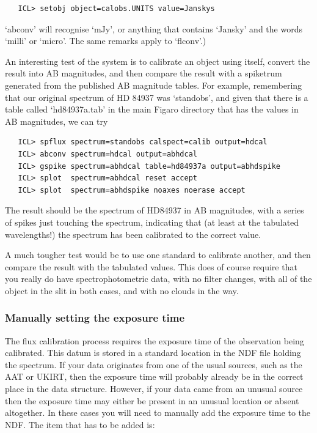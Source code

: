 \begin{verbatim}
   ICL> setobj object=calobs.UNITS value=Janskys
\end{verbatim}

   `abconv' will recognise `mJy', or anything that contains `Jansky'
   and the words `milli' or `micro'.  The same remarks apply to
   `flconv'.)

   An interesting test of the system is to calibrate an object using
   itself, convert the result into AB magnitudes, and then compare the
   result with a spiketrum generated from the published AB magnitude
   tables.  For example, remembering that our original spectrum of
   HD 84937 was `standobs', and given that there is a table called
   `hd84937a.tab' in the main Figaro directory that has the values in AB
   magnitudes, we can try

\begin{verbatim}
   ICL> spflux spectrum=standobs calspect=calib output=hdcal
   ICL> abconv spectrum=hdcal output=abhdcal
   ICL> gspike spectrum=abhdcal table=hd84937a output=abhdspike
   ICL> splot  spectrum=abhdcal reset accept
   ICL> splot  spectrum=abhdspike noaxes noerase accept
\end{verbatim}

   The result should be the spectrum of HD84937 in AB magnitudes, with a
   series of spikes just touching the spectrum, indicating that (at
   least at the tabulated wavelengths!) the spectrum has been calibrated
   to the correct value.

   A much tougher test would be to use one standard to calibrate
   another, and then compare the result with the tabulated values.  This
   does of course require that you really do have spectrophotometric
   data, with no filter changes, with all of the object in the slit in
   both cases, and with no clouds in the way.


\subsubsection{\label{techno5manexp}Manually setting the exposure time}

The flux calibration process requires the exposure time of the observation
being calibrated.  This datum is stored in a standard location in the NDF
file holding the spectrum.  If your data originates from one of the
usual sources, such as the AAT or UKIRT, then the exposure time will
probably already be in the correct place in the data structure.  However,
if your data came from an unusual source then the exposure time may either
be present in an unusual location or absent altogether.  In these cases
you will need to manually add the exposure time to the NDF.  The item
that has to be added is:

